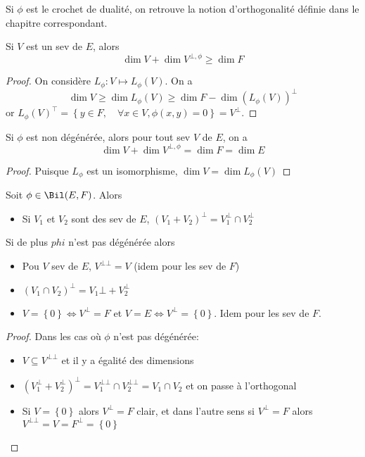 \begin{rem}
Si $\phi$ est le crochet de dualité, on retrouve la notion d'orthogonalité définie dans le chapitre correspondant.
\end{rem}


\begin{prop}
Si $V$ est un sev de  $E$, alors  \[
\dim V+\dim V^{\bot, \phi}\geq \dim F
\] 
\end{prop}

\begin{proof}
    On considère $L_\phi: V\longmapsto L_\phi(V)$. On a \[\dim V\geq \dim L_\phi(V)\geq \dim F-\dim (L_\phi(V))^\bot\]
    or $L_\phi(V)^\top=\left\{ y \in F, \quad \forall x \in  V, \phi(x, y)=0 \right\}  =V^\bot$.
\end{proof}

\begin{prop}
    Si $\phi$ est non dégénérée, alors pour tout sev  $V$ de  $E$, on a \[\dim V+\dim V^{\bot, \phi}=\dim F=\dim E\]
\end{prop}
\begin{proof}
    Puisque $L_\phi$ est un isomorphisme,  $\dim V=\dim L_\phi(V)$
\end{proof}

\begin{prop}
    Soit $\phi \in  \Bil(E, F)$. Alors \begin{itemize}
        \item Si  $V_1$ et $V_2$ sont des sev de $E$, $(V_1+V_2)^\bot=V_1^\bot\cap V_2^\bot$
    \end{itemize}
    Si  de plus $ phi$ n'est pas dégénérée alors \begin{itemize}
        \item Pou $V$ sev de $E$, $V ^{\bot\bot}=V$ (idem pour les sev de $F$)
        \item $(V_1\cap V_2)^\bot=V_1 \bot+V_2^\bot$
        \item  $V=\left\{ 0 \right\} \iff  V^\bot=F $  et $V=E \iff  V^\bot =\left\{ 0 \right\} $. Idem pour les sev de $F$.
    \end{itemize}
\end{prop}

\begin{proof}
Dans les cas où $\phi$ n'est pas dégénérée:  \begin{itemize}
    \item $V\subseteq V^{\bot\bot}$ et il y a égalité des dimensions
    \item $(V_1^\bot+V_2^\bot)^\bot=V_1^{\bot\bot}\cap V_2^{\bot\bot}=V_1\cap V_2$ et on passe à l'orthogonal
    \item Si $V = \left\{ 0 \right\} $ alors $V^\bot =F$ clair, et dans l'autre sens si  $V^\bot=F$ alors  $V^{\bot\bot}=V=F^\bot=\left\{ 0 \right\} $
\end{itemize}
\end{proof}


